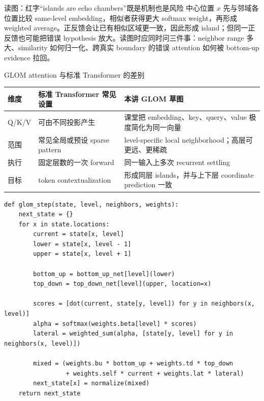 \documentclass[a4paper]{article}
\begin{document}
\begin{knowledgebox}{读图：红字“islands are echo chambers”既是机制也是风险}
中心位置 $x$ 先与邻域各位置比较 same-level embedding，相似者获得更大 softmax weight，再形成 weighted average。正反馈会让已有相似区域更一致，因此形成 island；但同一正反馈也可能把错误 hypothesis 放大。读图时应同时问三件事：neighbor range 多大、similarity 如何归一化、跨真实 boundary 的错误 attention 如何被 bottom-up evidence 拉回。
\end{knowledgebox}

\begin{knowledgebox}{GLOM attention 与标准 Transformer 的差别}
\begin{tabularx}{\textwidth}{L{0.24\textwidth}L{0.33\textwidth}>{\raggedright\arraybackslash}X}
\toprule
维度 & 标准 Transformer 常见设置 & 本讲 GLOM 草图 \\
\midrule
Q/K/V & 可由不同投影产生 & 课堂把 embedding、key、query、value 极度简化为同一向量 \\
范围 & 常见全局或预设 sparse pattern & level-specific local neighborhood；高层可更远、更稀疏 \\
执行 & 固定层数的一次 forward & 同一输入上多次 recurrent settling \\
目标 & token contextualization & 形成同层 islands，并与上下层 coordinate prediction 一致 \\
\bottomrule
\end{tabularx}
\end{knowledgebox}

\begin{lstlisting}[caption={GLOM 单次 settling update 的教学伪代码}]
def glom_step(state, level, neighbors, weights):
    next_state = {}
    for x in state.locations:
        current = state[x, level]
        lower = state[x, level - 1]
        upper = state[x, level + 1]

        bottom_up = bottom_up_net[level](lower)
        top_down = top_down_net[level](upper, location=x)

        scores = [dot(current, state[y, level]) for y in neighbors(x, level)]
        alpha = softmax(weights.beta[level] * scores)
        lateral = weighted_sum(alpha, [state[y, level] for y in neighbors(x, level)])

        mixed = (weights.bu * bottom_up + weights.td * top_down
                 + weights.self * current + weights.lat * lateral)
        next_state[x] = normalize(mixed)
    return next_state
\end{lstlisting}
\end{document}
